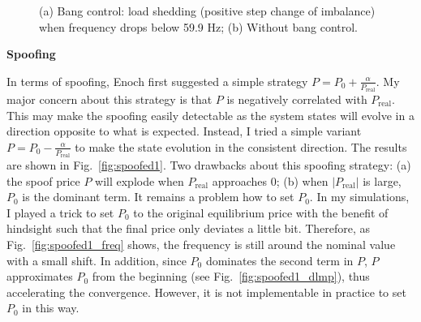 \documentclass[journal,12pt,onecolumn,draftclsnofoot]{IEEEtran}
\begin{document}
\begin{figure}
	\centering
{}
\caption{(a) Bang control: load shedding (positive step change of imbalance) when frequency drops below 59.9 Hz; (b) Without bang control.}
\label{fig:bangcontrol}
\end{figure}

\noindent
\textbf{Spoofing}

In terms of spoofing, Enoch first suggested a simple strategy $P=P_0+\frac{\alpha}{P_{\text{real}}}$. My major concern about this strategy is that $P$ is negatively correlated with $P_{\text{real}}$. This may make the spoofing easily detectable as the system states will evolve in a direction opposite to what is expected. Instead, I tried a simple variant $P=P_0-\frac{\alpha}{P_{\text{real}}}$ to make the state evolution in the consistent direction. The results are shown in Fig.~\ref{fig:spoofed1}. Two drawbacks about this spoofing strategy: (a) the spoof price $P$ will explode when $P_{\text{real}}$ approaches 0; (b) when $|P_{\text{real}}|$ is large, $P_0$ is the dominant term. It remains a problem how to set $P_0$. In my simulations, I played a trick to set $P_0$ to the original equilibrium price with the benefit of hindsight such that the final price only deviates a little bit. Therefore, as Fig.~\ref{fig:spoofed1_freq} shows, the frequency is still around the nominal value with a small shift. In addition, since $P_0$ dominates the second term in $P$, $P$ approximates $P_0$ from the beginning (see Fig.~\ref{fig:spoofed1_dlmp}), thus accelerating the convergence. However, it is not implementable in practice to set $P_0$ in this way.
\end{document}
